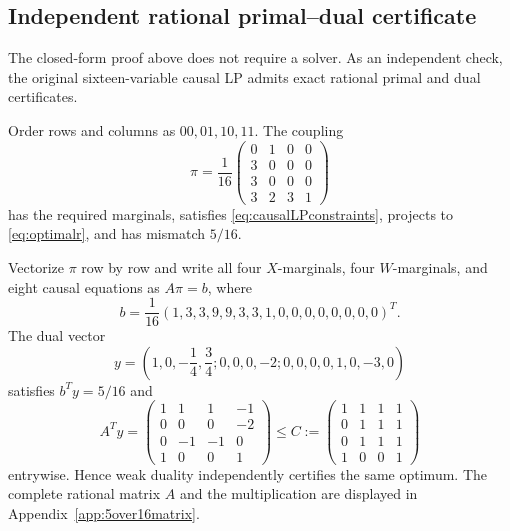 \documentclass[11pt,a4paper]{article}
\theoremstyle{definition}
\theoremstyle{remark}
\begin{document}
\subsection{Independent rational primal--dual certificate}

The closed-form proof above does not require a solver.  As an independent
check, the original sixteen-variable causal LP admits exact rational primal and
dual certificates.

Order rows and columns as \(00,01,10,11\).  The coupling
\begin{equation}
 \boxed{
 \pi=\frac1{16}
 \begin{pmatrix}
 0&1&0&0\\
 3&0&0&0\\
 3&0&0&0\\
 3&2&3&1
 \end{pmatrix}}
 \label{eq:primalmatrix}
\end{equation}
has the required marginals, satisfies \eqref{eq:causalLPconstraints}, projects
to \eqref{eq:optimalr}, and has mismatch \(5/16\).

Vectorize \(\pi\) row by row and write all four \(X\)-marginals, four
\(W\)-marginals, and eight causal equations as \(A\pi=b\), where
\begin{equation}
 b=\frac1{16}(1,3,3,9,9,3,3,1,0,0,0,0,0,0,0,0)^T.
 \label{eq:5over16b}
\end{equation}
The dual vector
\begin{equation}
 y=
 \left(
 1,0,-\frac14,\frac34;
 0,0,0,-2;
 0,0,0,0,1,0,-3,0
 \right)
 \label{eq:dualvector}
\end{equation}
satisfies \(b^Ty=5/16\) and
\[
 A^Ty=
 \begin{pmatrix}
 1&1&1&-1\\
 0&0&0&-2\\
 0&-1&-1&0\\
 1&0&0&1
 \end{pmatrix}
 \le
 C:=
 \begin{pmatrix}
 1&1&1&1\\
 0&1&1&1\\
 0&1&1&1\\
 1&0&0&1
 \end{pmatrix}
\]
entrywise.  Hence weak duality independently certifies the same optimum.  The
complete rational matrix \(A\) and the multiplication are displayed in
Appendix~\ref{app:5over16matrix}.
\end{document}

